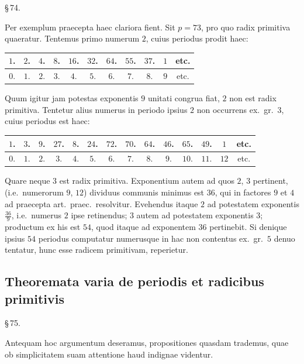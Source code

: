 \documentclass[12pt,a4paper]{article}
\theoremstyle{plain}
\theoremstyle{definition}
\theoremstyle{remark}
\begin{document}
\begin{center}\S\,74.\end{center}

Per exemplum praecepta haec clariora fient. Sit $p = 73$, pro quo radix primitiva quaeratur. Tentemus primo numerum $2$, cuius periodus prodit haec:
\begin{center}
\begin{tabular}{c|cccccccccc}
$1$. & $2$. & $4$. & $8$. & $16$. & $32$. & $64$. & $55$. & $37$. & $1$ & etc. \\\hline
$0$. & $1$. & $2$. & $3$. & $4$. & $5$. & $6$. & $7$. & $8$. & $9$ & etc.
\end{tabular}
\end{center}
Quum igitur jam potestas exponentis $9$ unitati congrua fiat, $2$ non est radix primitiva. Tentetur alius numerus in periodo ipsius $2$ non occurrens ex.\ gr.\ $3$, cuius periodus est haec:
\begin{center}
\begin{tabular}{c|ccccccccccccc}
$1$. & $3$. & $9$. & $27$. & $8$. & $24$. & $72$. & $70$. & $64$. & $46$. & $65$. & $49$. & $1$ & etc. \\\hline
$0$. & $1$. & $2$. & $3$. & $4$. & $5$. & $6$. & $7$. & $8$. & $9$. & $10$. & $11$. & $12$ & etc.
\end{tabular}
\end{center}
Quare neque $3$ est radix primitiva. Exponentium autem ad quos $2$, $3$ pertinent, (i.e.\ numerorum $9$, $12$) dividuus communis minimus est $36$, qui in factores $9$ et $4$ ad praecepta art.\ praec.\ resolvitur. Evehendus itaque $2$ ad potestatem exponentis $\frac{36}{9}$, i.e.\ numerus $2$ ipse retinendus; $3$ autem ad potestatem exponentis $3$; productum ex his est $54$, quod itaque ad exponentem $36$ pertinebit. Si denique ipsius $54$ periodus computatur numerusque in hac non contentus ex.\ gr.\ $5$ denuo tentatur, hunc esse radicem primitivam, reperietur.

\subsection*{Theoremata varia de periodis et radicibus primitivis}

\begin{center}\S\,75.\end{center}

Antequam hoc argumentum deseramus, propositiones quasdam trademus, quae ob simplicitatem suam attentione haud indignae videntur.
\end{document}
